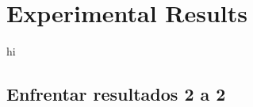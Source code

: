 
\chapter{Experimental Results} %

\label{Chapter4} %


\begin{pre-delivery}
  hi
\end{pre-delivery}

\begin{note}
  \section{Enfrentar resultados 2 a 2}
\end{note}

